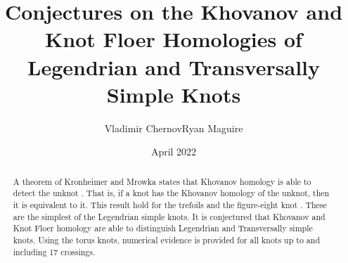 \documentclass{article}
\title{Conjectures on the Khovanov and Knot Floer Homologies of
       Legendrian and Transversally Simple Knots}
\author{Vladimir Chernov\hspace{2em}Ryan Maguire}
\date{April 2022}
\theoremstyle{plain}
\begin{document}
    \maketitle
    \tableofcontents
    \begin{abstract}
        \noindent
        A theorem of Kronheimer and Mrowka states that Khovanov homology is
        able to detect the unknot \cite{kronheimermrowka2010}.
        That is, if a knot has the Khovanov homology of the unknot, then it is
        equivalent to it. This result hold for the trefoils
        \cite{BaldwinSivekKhovanovTrefoils} and the figure-eight knot
        \cite{BaldwinDowlinKhovanovFigureEight}. These are the
        simplest of the Legendrian simple knots. It is conjectured that
        Khovanov and Knot Floer homology are able to distinguish Legendrian
        and Transversally simple knots. Using the torus knots, numerical
        evidence is provided for all knots up to and including 17 crossings.
    \end{abstract}
\end{document}

